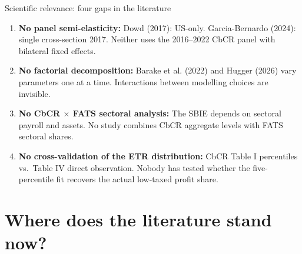 \documentclass[aspectratio=169, 11pt]{beamer}
\newcommand{\emphbx}[1]{\textcolor{Bordeaux}{\textbf{#1}}}
\begin{document}
\begin{frame}{Scientific relevance: four gaps in the literature}
\begin{enumerate}
  \item \emphbx{No panel semi-elasticity:} Dowd (2017): US-only. Garcia-Bernardo (2024): single cross-section 2017. Neither uses the 2016--2022 CbCR panel with bilateral fixed effects.

  \item \emphbx{No factorial decomposition:} Barake et al. (2022) and Hugger (2026) vary parameters one at a time. Interactions between modelling choices are invisible.

  \item \emphbx{No CbCR $\times$ FATS sectoral analysis:} The SBIE depends on sectoral payroll and assets. No study combines CbCR aggregate levels with FATS sectoral shares.

  \item \emphbx{No cross-validation of the ETR distribution:} CbCR Table I percentiles vs.\ Table IV direct observation. Nobody has tested whether the five-percentile fit recovers the actual low-taxed profit share.
\end{enumerate}
\end{frame}

\section{Where does the literature stand now?}
\end{document}
